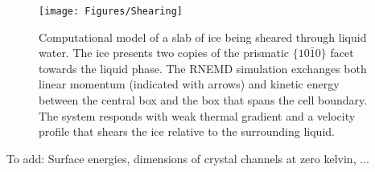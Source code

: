 \begin{figure} 
\texttt{[image: Figures/Shearing]}
\caption{\label{fig:Shearing} Computational model of a slab of ice
  being sheared through liquid water.  The ice presents two copies of
  the prismatic $\{10\bar{1}0\}$ facet towards the liquid phase.  The
  RNEMD simulation exchanges both linear momentum (indicated with
  arrows) and kinetic energy between the central box and the box that
  spans the cell boundary.  The system responds with weak thermal
  gradient and a velocity profile that shears the ice relative to the
  surrounding liquid.}
\end{figure}

To add: Surface energies, dimensions of crystal channels at zero kelvin, ...
